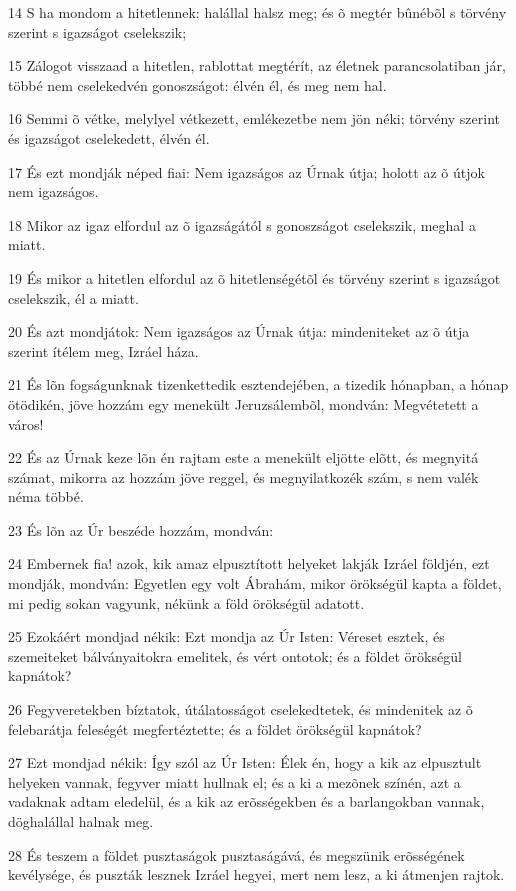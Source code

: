 \par 14 S ha mondom a hitetlennek: halállal halsz meg; és õ megtér bûnébõl s törvény szerint s igazságot cselekszik;
\par 15 Zálogot visszaad a hitetlen, rablottat megtérít, az életnek parancsolatiban jár, többé nem cselekedvén gonoszságot: élvén él, és meg nem hal.
\par 16 Semmi õ vétke, melylyel vétkezett, emlékezetbe nem jön néki; törvény szerint és igazságot cselekedett, élvén él.
\par 17 És ezt mondják néped fiai: Nem igazságos az Úrnak útja; holott az õ útjok nem igazságos.
\par 18 Mikor az igaz elfordul az õ igazságától s gonoszságot cselekszik, meghal a miatt.
\par 19 És mikor a hitetlen elfordul az õ hitetlenségétõl és törvény szerint s igazságot cselekszik, él a miatt.
\par 20 És azt mondjátok: Nem igazságos az Úrnak útja: mindeniteket az õ útja szerint ítélem meg, Izráel háza.
\par 21 És lõn fogságunknak tizenkettedik esztendejében, a tizedik hónapban, a hónap ötödikén, jöve hozzám egy menekült Jeruzsálembõl, mondván: Megvétetett a város!
\par 22 És az Úrnak keze lõn én rajtam este a menekült eljötte elõtt, és megnyitá számat, mikorra az hozzám jöve reggel, és megnyilatkozék szám, s nem valék néma többé.
\par 23 És lõn az Úr beszéde hozzám, mondván:
\par 24 Embernek fia! azok, kik amaz elpusztított helyeket lakják Izráel földjén, ezt mondják, mondván: Egyetlen egy volt Ábrahám, mikor örökségül kapta a földet, mi pedig sokan vagyunk, nékünk a föld örökségül adatott.
\par 25 Ezokáért mondjad nékik: Ezt mondja az Úr Isten: Véreset esztek, és szemeiteket bálványaitokra emelitek, és vért ontotok; és a földet örökségül kapnátok?
\par 26 Fegyveretekben bíztatok, útálatosságot cselekedtetek, és mindenitek az õ felebarátja feleségét megfertéztette; és a földet örökségül kapnátok?
\par 27 Ezt mondjad nékik: Így szól az Úr Isten: Élek én, hogy a kik az elpusztult helyeken vannak, fegyver miatt hullnak el; és a ki a mezõnek színén, azt a vadaknak adtam eledelül, és a kik az erõsségekben és a barlangokban vannak, döghalállal halnak meg.
\par 28 És teszem a földet pusztaságok pusztaságává, és megszünik erõsségének kevélysége, és puszták lesznek Izráel hegyei, mert nem lesz, a ki átmenjen rajtok.
